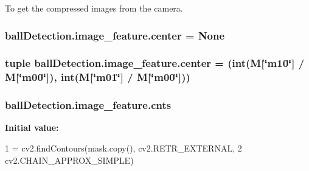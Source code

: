 To get the compressed images from the camera. 

\subsubsection[{\texorpdfstring{center}{center}}]{\setlength{\rightskip}{0pt plus 5cm}ball\+Detection.\+image\+\_\+feature.\+center = None\hspace{0.3cm}{\ttfamily [static]}}\hypertarget{classballDetection_1_1image__feature_a3b6a3451dbb6f3643346969ea9af3670}{}\label{classballDetection_1_1image__feature_a3b6a3451dbb6f3643346969ea9af3670}
\subsubsection[{\texorpdfstring{center}{center}}]{\setlength{\rightskip}{0pt plus 5cm}tuple ball\+Detection.\+image\+\_\+feature.\+center = (int({\bf M}\mbox{[}\char`\"{}m10\char`\"{}\mbox{]} / M\mbox{[}\char`\"{}m00\char`\"{}\mbox{]}), int({\bf M}\mbox{[}\char`\"{}m01\char`\"{}\mbox{]} / M\mbox{[}\char`\"{}m00\char`\"{}\mbox{]}))\hspace{0.3cm}{\ttfamily [static]}}\hypertarget{classballDetection_1_1image__feature_a7decaea2748c245d5940ea2f267a4cfc}{}\label{classballDetection_1_1image__feature_a7decaea2748c245d5940ea2f267a4cfc}
\subsubsection[{\texorpdfstring{cnts}{cnts}}]{\setlength{\rightskip}{0pt plus 5cm}ball\+Detection.\+image\+\_\+feature.\+cnts\hspace{0.3cm}{\ttfamily [static]}}\hypertarget{classballDetection_1_1image__feature_a13f936766fe3bbfe466d4bef773bb4f9}{}\label{classballDetection_1_1image__feature_a13f936766fe3bbfe466d4bef773bb4f9}
{\bfseries Initial value\+:}
\begin{DoxyCode}
1 = cv2.findContours(mask.copy(), cv2.RETR\_EXTERNAL,
2                                 cv2.CHAIN\_APPROX\_SIMPLE)
\end{DoxyCode}
